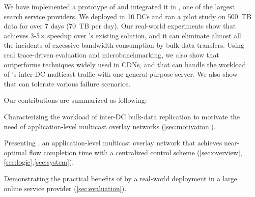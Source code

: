 We have implemented a prototype of \name and integrated it in
\company, one of the largest search service providers.
We deployed \name in 10 DCs and ran a pilot study on 500~TB
data for over 7 days (70~TB per day).
Our real-world experiments show that \name achieves 3-5$\times$
speedup over \company's existing solution, and it can eliminate almost all the
incidents of excessive bandwidth consumption by bulk-data
transfers.
Using real trace-driven evaluation and microbanchmarking,
we also show that \name outperforms techniques widely used in
CDNs, and that \name can handle the workload of \company's
inter-DC multicast traffic with one general-purpose server.
We also show that \name can tolerate various failure scenarios.


Our contributions are summarized as following:
\begin{packeditemize}
\item Characterizing the workload of inter-DC bulk-data
replication to motivate the need of application-level
multicast overlay networks (\Section\ref{sec:motivation}).
\item Presenting \name, an application-level
multicast overlay network that achieves near-optimal flow completion
time with a centralized control scheme (\Section\ref{sec:overview},\ref{sec:logic},\ref{sec:system}).
\item Demonstrating the practical benefits of \name by a real-world
 deployment in a large online service provider (\Section\ref{sec:evaluation}).
\end{packeditemize}
